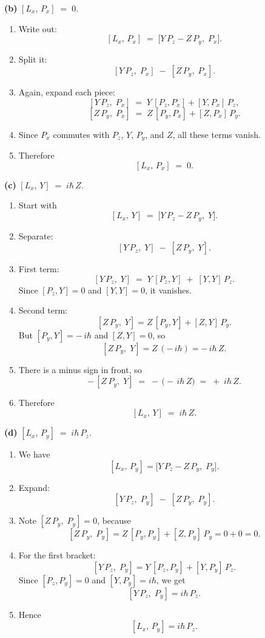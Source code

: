 \documentclass{article}
\begin{document}
\bigskip
\noindent
\textbf{(b)} \; $\displaystyle [L_x,\,P_x] \;=\; 0.$

\begin{enumerate}
\item Write out:
\[
[L_x,\,P_x] 
\;=\;
\bigl[Y\,P_z - Z\,P_y,\;P_x\bigr].
\]
\item Split it:
\[
[Y\,P_z,\;P_x] \;-\; [Z\,P_y,\;P_x].
\]
\item Again, expand each piece:
\[
[Y\,P_z,\;P_x] 
\;=\;
Y\,[P_z,P_x] + [Y,P_x]\,P_z,
\]
\[
[Z\,P_y,\;P_x]
\;=\;
Z\,[P_y,P_x] + [Z,P_x]\,P_y.
\]
\item Since $P_x$ commutes with $P_z$, $Y$, $P_y$, and $Z$, all these terms vanish.
\item Therefore
\[
[L_x,\,P_x] \;=\; 0.
\]
\end{enumerate}

\bigskip
\noindent
\textbf{(c)} \; $\displaystyle [L_x,\,Y] \;=\; i\hbar\,Z.$

\begin{enumerate}
\item Start with
\[
[L_x,\,Y]
\;=\;
\bigl[Y\,P_z - Z\,P_y,\;Y\bigr].
\]
\item Separate:
\[
[Y\,P_z,\;Y] \;-\; [Z\,P_y,\;Y].
\]
\item First term:
\[
[Y\,P_z,\;Y]
\;=\;
Y\,[P_z,Y] \;+\; [Y,Y]\,P_z.
\]
Since $[P_z,Y]=0$ and $[Y,Y]=0$, it vanishes.
\item Second term:
\[
[Z\,P_y,\;Y]
=
Z\,[P_y,Y] + [Z,Y]\,P_y.
\]
But $[P_y,Y] = -\,i\hbar$ and $[Z,Y]=0$, so 
\[
[Z\,P_y,\;Y] = Z\,(-\,i\hbar) = -\,i\hbar\,Z.
\]
\item There is a minus sign in front, so
\[
-\,[Z\,P_y,\;Y]
\;=\;
-\,\bigl(-\,i\hbar\,Z\bigr)
\;=\;
+\;i\hbar\,Z.
\]
\item Therefore
\[
[L_x,\,Y] \;=\; i\hbar\,Z.
\]
\end{enumerate}

\bigskip
\noindent
\textbf{(d)} \; $\displaystyle [L_x,\,P_y] \;=\; i\hbar\,P_z.$

\begin{enumerate}
\item We have
\[
[L_x,\,P_y]
=
\bigl[Y\,P_z - Z\,P_y,\;P_y\bigr].
\]
\item Expand:
\[
[Y\,P_z,\;P_y] \;-\; [Z\,P_y,\;P_y].
\]
\item Note $[Z\,P_y,\;P_y] = 0$, because
\[
[Z\,P_y,\;P_y]
= Z\,[P_y,P_y] + [Z,P_y]\,P_y
= 0 + 0
= 0.
\]
\item For the first bracket:
\[
[Y\,P_z,\;P_y]
= Y\,[P_z,P_y] + [Y,P_y]\,P_z.
\]
Since $[P_z,P_y]=0$ and $[Y,P_y] = i\hbar$, we get
\[
[Y\,P_z,\;P_y]
= i\hbar\,P_z.
\]
\item Hence
\[
[L_x,\,P_y]
= i\hbar\,P_z.
\]
\end{enumerate}
\end{document}
